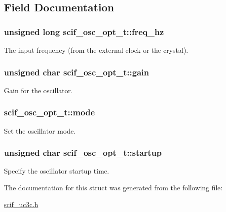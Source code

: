 \subsection{\-Field \-Documentation}
\hypertarget{structscif__osc__opt__t_a6a60d571530d7b7eabe0cf5eefe6fe7a}{
\subsubsection[{freq\-\_\-hz}]{\setlength{\rightskip}{0pt plus 5cm}unsigned long {\bf scif\-\_\-osc\-\_\-opt\-\_\-t\-::freq\-\_\-hz}}}
\label{structscif__osc__opt__t_a6a60d571530d7b7eabe0cf5eefe6fe7a}


\-The input frequency (from the external clock or the crystal). 

\hypertarget{structscif__osc__opt__t_a6642c00d5955b3fb3a2cbd3320977f23}{
\subsubsection[{gain}]{\setlength{\rightskip}{0pt plus 5cm}unsigned char {\bf scif\-\_\-osc\-\_\-opt\-\_\-t\-::gain}}}
\label{structscif__osc__opt__t_a6642c00d5955b3fb3a2cbd3320977f23}


\-Gain for the oscillator. 

\hypertarget{structscif__osc__opt__t_a1cd9d6f0cb38d71a344fbdab1fe90337}{
\subsubsection[{mode}]{ {\bf scif\-\_\-osc\-\_\-opt\-\_\-t\-::mode}}}
\label{structscif__osc__opt__t_a1cd9d6f0cb38d71a344fbdab1fe90337}


\-Set the oscillator mode. 

\hypertarget{structscif__osc__opt__t_aa056d244d7d751361c02bd7d29c06b69}{
\subsubsection[{startup}]{\setlength{\rightskip}{0pt plus 5cm}unsigned char {\bf scif\-\_\-osc\-\_\-opt\-\_\-t\-::startup}}}
\label{structscif__osc__opt__t_aa056d244d7d751361c02bd7d29c06b69}


\-Specify the oscillator startup time. 



\-The documentation for this struct was generated from the following file\-:\begin{DoxyCompactItemize}
\item 
\hyperlink{scif__uc3c_8h}{scif\-\_\-uc3c.\-h}\end{DoxyCompactItemize}
